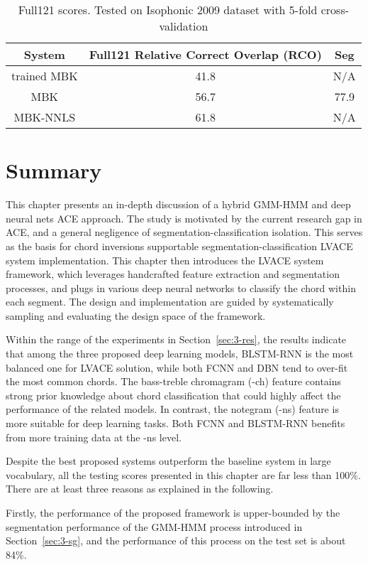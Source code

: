 \begin{table}[h]
\footnotesize
\centering
\caption{Full121 scores. Tested on Isophonic 2009 dataset with 5-fold cross-validation \cite{mauch2010automatic}}
\label{tab:3-fullmbk}
\begin{tabular}{|c|c|c|}\hline
System & Full121 Relative Correct Overlap (RCO) & Seg \\ \hline
trained MBK & 41.8 & N/A \\ \hline
MBK & 56.7 & 77.9 \\ \hline
MBK-NNLS & 61.8 & N/A \\ \hline
\end{tabular}
\end{table}


\section{Summary} \label{sec:3-concln}
This chapter presents an in-depth discussion of a hybrid GMM-HMM and deep neural nets ACE approach. The study is motivated by the current research gap in ACE, and a general negligence of segmentation-classification isolation. This serves as the basis for chord inversions supportable segmentation-classification LVACE system implementation. This chapter then introduces the LVACE system framework, which leverages handcrafted feature extraction and segmentation processes, and plugs in various deep neural networks to classify the chord within each segment. The design and implementation are guided by systematically sampling and evaluating the design space of the framework.

Within the range of the experiments in Section~\ref{sec:3-res}, the results indicate that among the three proposed deep learning models, BLSTM-RNN is the most balanced one for LVACE solution, while both FCNN and DBN tend to over-fit the most common chords. The bass-treble chromagram (-ch) feature contains strong prior knowledge about chord classification that could highly affect the performance of the related models. In contrast, the notegram (-ns) feature is more suitable for deep learning tasks. Both FCNN and BLSTM-RNN benefits from more training data at the -ns level.

Despite the best proposed systems outperform the baseline system in large vocabulary, all the testing scores presented in this chapter are far less than 100\%. There are at least three reasons as explained in the following.


Firstly, the performance of the proposed framework is upper-bounded by the segmentation performance of the GMM-HMM process introduced in Section~\ref{sec:3-sg}, and the performance of this process on the test set is about 84\%.

